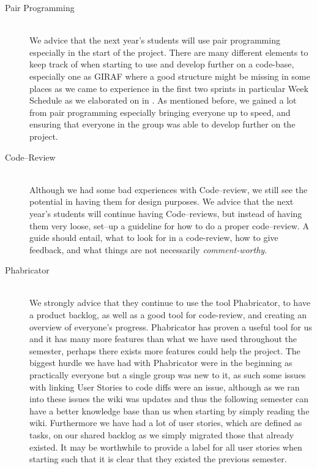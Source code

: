 \begin{description}
	\item[Pair Programming] \hfill \\
	We advice that the next year's students will use pair programming especially in the start of the project.
	There are many different elements to keep track of when starting to use and develop further on a code-base, especially one as GIRAF where a good structure might be missing in some places as we came to experience in the first two sprints in particular Week Schedule as we elaborated on in .
	As mentioned before, we gained a lot from pair programming especially bringing everyone up to speed, and ensuring that everyone in the group was able to develop further on the project.

	\item[Code--Review] \hfill \\
	Although we had some bad experiences with Code--review, we still see the potential in having them for design purposes.
	We advice that the next year's students will continue having Code--reviews, but instead of having them very loose, set--up a guideline for how to do a proper code--review.
	A guide should entail, what to look for in a code-review, how to give feedback, and what things are not necessarily \textit{comment-worthy}.

	\item[Phabricator] \hfill \\
	We strongly advice that they continue to use the tool Phabricator, to have a product backlog, as well as a good tool for code-review, and creating an overview of everyone's progress.
	Phabricator has proven a useful tool for us and it has many more features than what we have used throughout the semester, perhaps there exists more features could help the project.
	The biggest hurdle we have had with Phabricator were in the beginning as practically everyone but a single group was new to it, as such some issues with linking User Stories to code diffs were an issue, although as we ran into these issues the wiki was updates and thus the following semester can have a better knowledge base than us when starting by simply reading the wiki.
	Furthermore we have had a lot of user stories, which are defined as tasks, on our shared backlog as we simply migrated those that already existed.
	It may be worthwhile to provide a label for all user stories when starting such that it is clear that they existed the previous semester.


\end{description}
